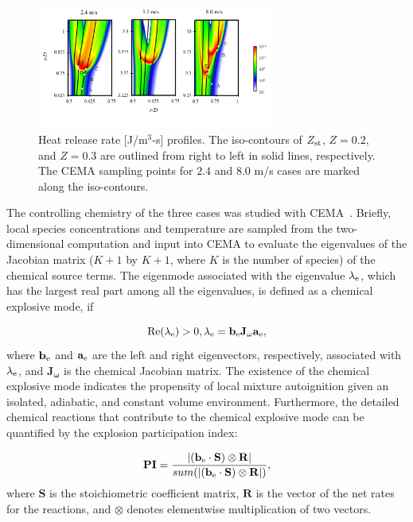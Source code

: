 \documentclass[review,3p,times]{elsarticle}
\begin{document}
\begin{figure}[t]
  \centering
  \scriptsize
  \vspace{-0.1in}
  \includegraphics[width=0.7\textwidth]{HRR_V.png}
  \normalsize
  \vspace{-0.4in}
  \caption{Heat release rate [J/m$^3$-s] profiles.  The iso-contours of $Z_{\rm st}$, $Z = 0.2$, and $Z = 0.3$ are outlined from right to left in solid lines, respectively.  The CEMA sampling points for $2.4$ and $8.0$ m/s cases are marked along the iso-contours.}
  \label{fig:HRR_V}
\end{figure}

The controlling chemistry of the three cases was studied with CEMA~\cite{lu10,shan12}.   Briefly, local species concentrations and temperature are sampled from the two-dimensional computation and input into CEMA to evaluate the eigenvalues of the Jacobian matrix ($K + 1$ by $K + 1$, where $K$ is the number of species) of the chemical source terms.  The eigenmode associated with the eigenvalue $\lambda_{\rm e}$, which has the largest real part among all the eigenvalues, is defined as a chemical explosive mode, if

\begin{equation}
\rm{Re}(\lambda_{\rm e}) > 0, \lambda_{\rm e} = \mathbf{b_{\rm e}J_{\omega}a_{\rm e}},
\end{equation}
where $\mathbf{b_{\rm e}}$ and $\mathbf{a_{\rm e}}$ are the left and right eigenvectors, respectively, associated with $\lambda_{\rm e}$, and $\mathbf{J_{\omega}}$ is the chemical Jacobian matrix.  The existence of the chemical explosive mode indicates the propensity of local mixture autoignition given an isolated, adiabatic, and constant volume environment.  Furthermore, the detailed chemical reactions that contribute to the chemical explosive mode can be quantified by the explosion participation index:

\begin{equation}
\mathbf{PI} = \frac{|(\mathbf{b_{\rm e}} \cdot \mathbf{S}) \otimes \mathbf{R}|}{sum(|(\mathbf{b_{\rm e}} \cdot \mathbf{S}) \otimes \mathbf{R}|)},
\end{equation}
where $\mathbf{S}$ is the stoichiometric coefficient matrix, $\mathbf{R}$ is the vector of the net rates for the reactions, and $\otimes$ denotes elementwise multiplication of two vectors.  
\end{document}

